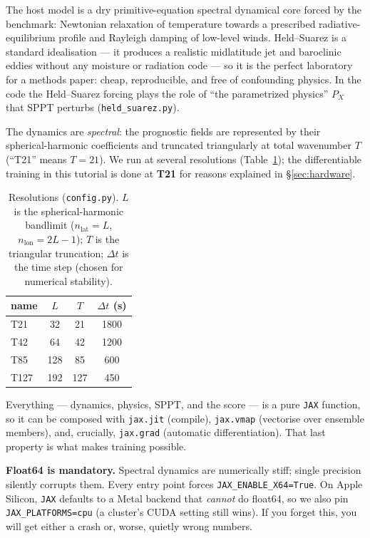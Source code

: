 \documentclass[11pt]{article}
\newcommand{\code}[1]{\texttt{#1}}
\begin{document}
The host model is a dry primitive-equation spectral dynamical core forced by the
\citet{heldsuarez1994} benchmark: Newtonian relaxation of temperature towards a
prescribed radiative-equilibrium profile and Rayleigh damping of low-level winds.
Held--Suarez is a standard idealisation --- it produces a realistic midlatitude
jet and baroclinic eddies without any moisture or radiation code --- so it is the
perfect laboratory for a methods paper: cheap, reproducible, and free of
confounding physics. In the code the Held--Suarez forcing plays the role of ``the
parametrized physics'' $P_X$ that SPPT perturbs (\code{held\_suarez.py}).

The dynamics are \emph{spectral}: the prognostic fields are represented by their
spherical-harmonic coefficients and truncated triangularly at total wavenumber
$T$ (``T21'' means $T=21$). We run at several resolutions
(Table~\ref{tab:res}); the differentiable training in this tutorial is done at
\textbf{T21} for reasons explained in \S\ref{sec:hardware}.

\begin{table}[h]
\centering
\caption{Resolutions (\code{config.py}). $L$ is the spherical-harmonic bandlimit
($n_{\text{lat}}=L$, $n_{\text{lon}}=2L-1$); $T$ is the triangular truncation;
$\Delta t$ is the time step (chosen for numerical stability).}
\label{tab:res}
\begin{tabular}{lccc}
\toprule
name & $L$ & $T$ & $\Delta t$ (s) \\
\midrule
T21  & 32  & 21  & 1800 \\
T42  & 64  & 42  & 1200 \\
T85  & 128 & 85  & 600  \\
T127 & 192 & 127 & 450  \\
\bottomrule
\end{tabular}
\end{table}

Everything --- dynamics, physics, SPPT, and the score --- is a pure \code{JAX}
function, so it can be composed with \code{jax.jit} (compile), \code{jax.vmap}
(vectorise over ensemble members), and, crucially, \code{jax.grad} (automatic
differentiation). That last property is what makes training possible.

\begin{keybox}
\textbf{Float64 is mandatory.} Spectral dynamics are numerically stiff; single
precision silently corrupts them. Every entry point forces
\code{JAX\_ENABLE\_X64=True}. On Apple Silicon, \code{JAX} defaults to a Metal
backend that \emph{cannot} do float64, so we also pin \code{JAX\_PLATFORMS=cpu}
(a cluster's CUDA setting still wins). If you forget this, you will get either a
crash or, worse, quietly wrong numbers.
\end{keybox}
\end{document}
